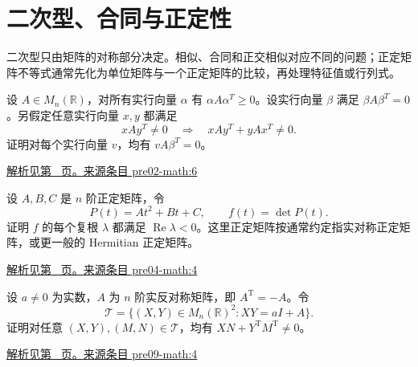 \documentclass[12pt,fontset=fandol]{ctexart}
\begin{document}
\section{二次型、合同与正定性}

\label{sec:questions-7}

二次型只由矩阵的对称部分决定。相似、合同和正交相似对应不同的问题；正定矩阵不等式通常先化为单位矩阵与一个正定矩阵的比较，再处理特征值或行列式。

\begin{example}\label{ex:pre02-math:6}

设 $A\in M_n(\mathbb R)$，对所有实行向量 $\alpha$ 有 $\alpha A\alpha^T\ge0$。设实行向量 $\beta$ 满足 $\beta A\beta^T=0$。另假定任意实行向量 $x,y$ 都满足
\[
xAy^T\ne0\quad\Longrightarrow\quad xAy^T+yAx^T\ne0.
\]
证明对每个实行向量 $v$，均有 $vA\beta^T=0$。

\par\hyperref[ans:pre02-math:6]{解析见第~\pageref{ans:pre02-math:6} 页。}\quad\href{https://github.com/lzxcr/cmc-mathematics/blob/64916fa1fdbc3e444a652eca204d5669058ee321/src/problems/preliminary/02/06.md}{来源条目 pre02-math:6}

\end{example}

\begin{example}\label{ex:pre04-math:4}

设 $A,B,C$ 是 $n$ 阶正定矩阵，令
\[
P(t)=At^2+Bt+C,\qquad f(t)=\det P(t).
\]
证明 $f$ 的每个复根 $\lambda$ 都满足 $\operatorname{Re}\lambda<0$。这里正定矩阵按通常约定指实对称正定矩阵，或更一般的 Hermitian 正定矩阵。

\par\hyperref[ans:pre04-math:4]{解析见第~\pageref{ans:pre04-math:4} 页。}\quad\href{https://github.com/lzxcr/cmc-mathematics/blob/64916fa1fdbc3e444a652eca204d5669058ee321/src/problems/preliminary/04/04.md}{来源条目 pre04-math:4}

\end{example}

\begin{example}\label{ex:pre09-math:4}

设 $a\ne0$ 为实数，$A$ 为 $n$ 阶实反对称矩阵，即 $A^{\mathrm T}=-A$。令
\[
\mathcal T=\{(X,Y)\in M_n(\mathbb R)^2:XY=aI+A\}.
\]
证明对任意 $(X,Y),(M,N)\in\mathcal T$，均有 $XN+Y^{\mathrm T}M^{\mathrm T}\ne0$。

\par\hyperref[ans:pre09-math:4]{解析见第~\pageref{ans:pre09-math:4} 页。}\quad\href{https://github.com/lzxcr/cmc-mathematics/blob/64916fa1fdbc3e444a652eca204d5669058ee321/src/problems/preliminary/09/04.md}{来源条目 pre09-math:4}

\end{example}
\end{document}
